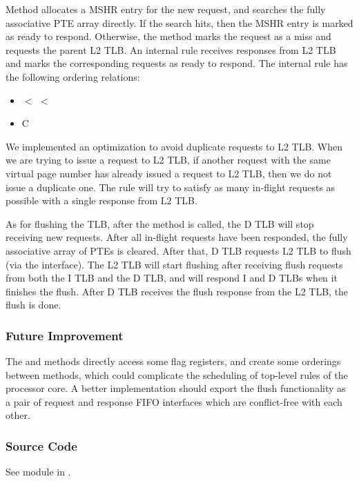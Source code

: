 Method  allocates a MSHR entry for the new request, and searches the fully associative PTE array directly.
If the search hits, then the MSHR entry is marked as ready to respond.
Otherwise, the method marks the request as a miss and requests the parent L2 TLB.
An internal rule  receives responses from L2 TLB and marks the corresponding requests as ready to respond.
The internal rule  has the following ordering relations:
\begin{itemize}
    \item {} $<$  $<$ 
    \item {} C 
\end{itemize}

We implemented an optimization to avoid duplicate requests to L2 TLB.
When we are trying to issue a request to L2 TLB, if another request with the same virtual page number has already issued a request to L2 TLB, then we do not issue a duplicate one.
The  rule will try to satisfy as many in-flight requests as possible with a single response from L2 TLB.

As for flushing the TLB, after the  method is called, the D TLB will stop receiving new requests.
After all in-flight requests have been responded, the fully associative array of PTEs is cleared.
After that, D TLB requests L2 TLB to flush (via the  interface).
The L2 TLB will start flushing after receiving flush requests from both the I TLB and the D TLB, and will respond I and D TLBs when it finishes the flush.
After D TLB receives the flush response from the L2 TLB, the flush is done.

\subsubsection{Future Improvement}
The  and  methods directly access some flag registers, and create some orderings between methods, which could complicate the scheduling of top-level rules of the processor core.
A better implementation should export the flush functionality as a pair of request and response FIFO interfaces which are conflict-free with each other.

\subsubsection{Source Code}
See module  in .
